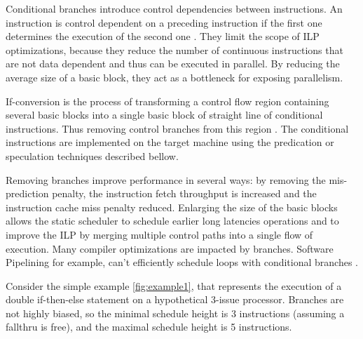 Conditional branches introduce control dependencies between instructions. An instruction is control dependent on a preceding instruction if the first one determines the execution of the second one \cite{Kennedy:2001:OCM:502981}. They limit the scope of ILP optimizations, because they reduce the number of continuous instructions that are not data dependent and thus can be executed in parallel. By reducing the average size of a basic block, they act as a bottleneck for exposing parallelism.

If-conversion is the process of transforming a control flow region containing several basic blocks into a single basic block of straight line of conditional instructions. Thus removing control branches from this region \cite{Schlansker97achievinghigh}. The conditional instructions are implemented on the target machine using the predication or speculation techniques described bellow. 

Removing branches improve performance in several ways: by removing the mis-prediction penalty, the instruction fetch throughput is increased and the instruction cache miss penalty reduced. Enlarging the size of the basic blocks allows the static scheduler to schedule earlier long latencies operations and to improve the ILP by merging multiple control paths into a single flow of execution. Many compiler optimizations are impacted by branches. Software Pipelining for example, can't efficiently schedule loops with conditional branches \cite{Warter:1992:EMS:144953.145796}.

Consider the simple example \ref{fig:example1}, that represents the execution of a double if-then-else statement on a hypothetical 3-issue processor. Branches are not highly biased, so the minimal schedule height is 3 instructions (assuming a fallthru is free), and the maximal schedule height is 5 instructions.

